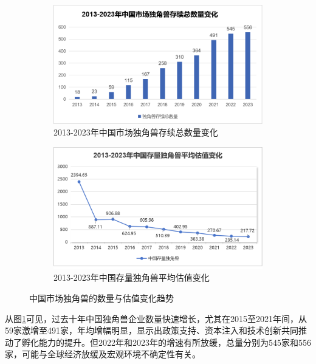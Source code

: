 \begin{figure}[H]
    \centering
    \begin{subfigure}[b]{0.45\linewidth} %
        \centering
        \includegraphics[width=\linewidth]{figure/08中国市场独角兽存续总数量变化.png}
        \caption{2013-2023年中国市场独角兽存续总数量变化}
        \label{fig:独角兽存续数量}
    \end{subfigure}
    \hfill %
    \begin{subfigure}[b]{0.45\linewidth}
        \centering
        \includegraphics[width=\linewidth]{figure/09中国存量独角兽平均估值变化.png}
        \caption{2013-2023年中国存量独角兽平均估值变化}
        \label{fig:独角兽平均估值}
    \end{subfigure}
    \caption{中国市场独角兽的数量与估值变化趋势}
    \label{fig:独角兽数量与估值变化}
\end{figure}

从图\ref{fig:独角兽存续数量}可见，过去十年中国独角兽企业数量快速增长，尤其在2015至2021年间，从59家激增至491家，年均增幅明显，显示出政策支持、资本注入和技术创新共同推动了孵化能力的提升。但2022年和2023年的增速有所放缓，总量分别为545家和556家，可能与全球经济放缓及宏观环境不确定性有关。

